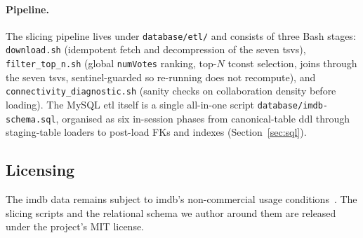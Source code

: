 \begin{sloppypar}\paragraph{Pipeline.} The slicing pipeline lives under \texttt{database/etl/} and consists of three Bash stages: \texttt{download.sh} (idempotent fetch and decompression of the seven \acp{tsv}), \texttt{filter\_top\_n.sh} (global \texttt{numVotes} ranking, top-$N$ tconst selection, joins through the seven \acp{tsv}, sentinel-guarded so re-running does not recompute), and \texttt{connectivity\_diagnostic.sh} (sanity checks on collaboration density before loading). The MySQL \ac{etl} itself is a single all-in-one script \texttt{database/imdb-schema.sql}, organised as six in-session phases from canonical-table \ac{ddl} through staging-table loaders to post-load FKs and indexes (Section~\ref{sec:sql}).\end{sloppypar}

\subsection{Licensing}

The \ac{imdb} data remains subject to \ac{imdb}'s non-commercial usage conditions~\cite{imdb-terms}. The slicing scripts and the relational schema we author around them are released under the project's MIT license.
